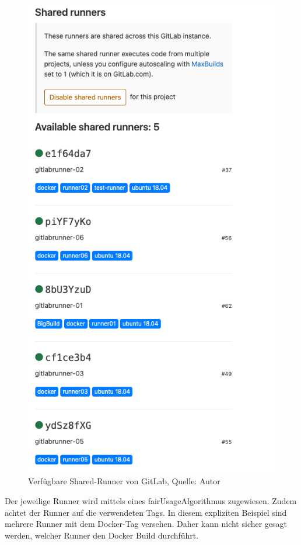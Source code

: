 \begin{figure}[H]
	\centering
	\includegraphics[scale=0.3]{images/gitLabRunner.png}
	\caption[Verfügbare Shared-Runner von GitLab]{Verfügbare Shared-Runner von GitLab, Quelle: Autor}
	\label{img: runnerGitlab}
\end{figure}
Der jeweilige Runner wird mittels eines \gls{fairUsageAlgorithmus} zugewiesen. Zudem achtet der Runner auf die verwendeten Tags. In diesem expliziten Beispiel sind mehrere Runner mit dem Docker-Tag versehen. Daher kann nicht sicher gesagt werden, welcher Runner den Docker Build durchführt. 
